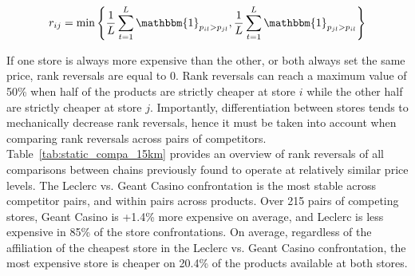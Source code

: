 \documentclass[english]{article}
\begin{document}
\begin{align}
r_{ij} = \min\left\{\frac{1}{L} \sum_{t=1}^{L} \mathbbm{1}_{p_{il} > p_{jl}}, \frac{1}{L} \sum_{t=1}^{L} \mathbbm{1}_{p_{jl} > p_{il}}\right\}
\label{formula_rr_static}
\end{align}


If one store is always more expensive than the other, or both always set the same price, rank reversals are equal to 0. Rank reversals can reach a maximum value of 50\% when half of the products are strictly cheaper at store $i$ while the other half are strictly cheaper at store $j$. Importantly, differentiation between stores tends to mechanically decrease rank reversals, hence it must be taken into account when comparing rank reversals across pairs of competitors. Table~\ref{tab:static_compa_15km} provides an overview of rank reversals of all comparisons between chains previously found to operate at relatively similar price levels. The Leclerc vs. Geant Casino confrontation is the most stable across competitor pairs, and within pairs across products. Over 215 pairs of competing stores, Geant Casino is +1.4\% more expensive on average, and Leclerc is less expensive in 85\% of the store confrontations. On average, regardless of the affiliation of the cheapest store in the Leclerc vs. Geant Casino confrontation, the most expensive store is cheaper on 20.4\% of the products available at both stores.
\end{document}

